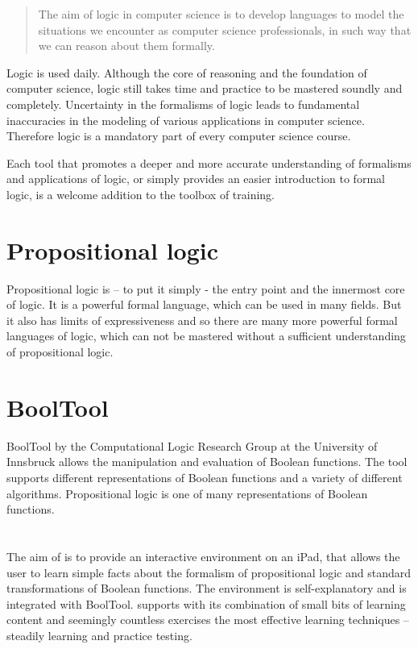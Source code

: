 
\begin{quote}
The aim of logic in computer science is to develop languages 
to model the situations we encounter as computer science professionals, 
in such way that we can reason about them formally. \cite{Huth:2004:LCS:975331}
\end{quote}

Logic is used daily. Although the core of reasoning and the foundation of computer science, 
logic still takes time and practice to be mastered soundly and completely. 
Uncertainty in the formalisms of logic leads to fundamental inaccuracies 
in the modeling of various applications in computer science. 
Therefore logic is a mandatory part of every computer science course. 

Each tool that promotes a deeper and more accurate understanding of formalisms and applications of logic,
or simply provides an easier introduction to formal logic, 
is a welcome addition to the toolbox of training.


\section{Propositional logic}

Propositional logic is – to put it simply - the entry point and the innermost core of logic. 
It is a powerful formal language, which can be used in many fields. 
But it also has limits of expressiveness and so 
there are many more powerful formal languages of logic, 
which can not be mastered without a sufficient understanding  of propositional logic.

\section{BoolTool}

BoolTool by the Computational Logic Research Group at the University of Innsbruck allows the manipulation and evaluation of Boolean functions. The tool supports different representations of Boolean functions and a variety of different algorithms.
Propositional logic is one of many representations of Boolean functions.

\section{\Nyaya}

The aim of \Nyaya is to provide an interactive environment on an iPad,
that allows the user to learn simple facts about the formalism of propositional logic 
and standard transformations of Boolean functions. 
The environment is self-explanatory and is integrated with BoolTool. 
\Nyaya supports with its combination 
of small bits of learning content and seemingly countless exercises 
the most effective learning techniques – 
steadily learning and practice testing.\cite{Dunlosky01012013}


%
